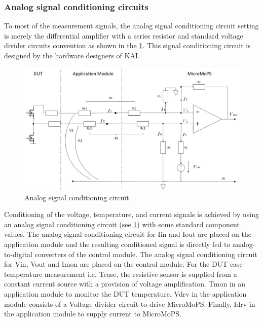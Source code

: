 \subsubsection{Analog signal conditioning circuits}\label{sec:asc}
To most of the measurement signals, the analog signal conditioning circuit setting is merely the differential amplifier with a series resistor and standard voltage divider circuits convention as shown in the \cref{fig:Conditioning}. This signal conditioning circuit is designed by the hardware designers of KAI.  
\begin{figure}[htb]
		\centering
		\includegraphics[trim=10 0 0 0, clip, width=150mm, scale=0.75]{images/conditioning.JPG}
		\caption{Analog signal conditioning circuit}
		\label{fig:Conditioning}
\end{figure}

Conditioning of the voltage, temperature, and current signals is achieved by using an analog signal conditioning circuit (see \cref{fig:Conditioning}) with some standard component values. 
The analog signal conditioning circuit for \gls{Iin} and \gls{Iout} are placed on the application module and the resulting conditioned signal is directly fed to analog-to-digital converters of the control module. 
The analog signal conditioning circuit for \gls{Vin}, \gls{Vout} and \gls{Imon} are placed on the control module. 
For the DUT case temperature measurement i.e. \gls{Tcase}, the resistive sensor is supplied from a constant current source with a provision of voltage amplification. \gls{Tmon} in an application module to monitor the DUT temperature. 
\gls{Vdrv} in the application module consists of a Voltage divider circuit to drive MicroMoPS. 
Finally, \gls{Idrv} in the application module to supply current to MicroMoPS.

